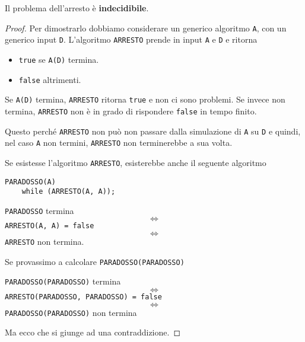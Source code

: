 \begin{theorem}
	Il problema dell'arresto \`e \textbf{indecidibile}.

	\begin{proof}
		Per dimostrarlo dobbiamo considerare un generico algoritmo \verb|A|, con un generico input \verb|D|.
		L'algoritmo \verb|ARRESTO| prende in input \verb|A| e \verb|D| e ritorna
		\begin{itemize}
			\item \verb|true| se \verb|A(D)| termina.
			\item \verb|false| altrimenti.
		\end{itemize}
		Se \verb|A(D)| termina, \verb|ARRESTO| ritorna \verb|true| e non ci sono problemi. Se invece non termina,
		\verb|ARRESTO| non \`e in grado di rispondere \verb|false| in tempo finito.

		Questo perch\'e \verb|ARRESTO| non pu\`o non passare dalla simulazione di \verb|A| su \verb|D| e quindi, nel
		caso \verb|A| non termini, \verb|ARRESTO| non terminerebbe a sua volta.

		Se esistesse l'algoritmo \verb|ARRESTO|, esisterebbe anche il seguente algoritmo
		\begin{lstlisting}[style=pseudo-style]
PARADOSSO(A)
	while (ARRESTO(A, A));
		\end{lstlisting}
		\begin{center}
			\verb|PARADOSSO| termina
			\[ \Leftrightarrow \]
			\verb|ARRESTO(A, A) = false|
			\[ \Leftrightarrow \]
			\verb|ARRESTO| non termina.
		\end{center}

		Se provassimo a calcolare \verb|PARADOSSO(PARADOSSO)|
		\begin{center}
			\verb|PARADOSSO(PARADOSSO)| termina
			\[ \Leftrightarrow \]
			\verb|ARRESTO(PARADOSSO, PARADOSSO) = false|
			\[ \Leftrightarrow \]
			\verb|PARADOSSO(PARADOSSO)| non termina
		\end{center}
		Ma ecco che si giunge ad una contraddizione.
	\end{proof}
\end{theorem}
